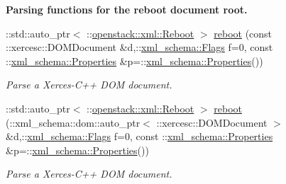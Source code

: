 \begin{Indent}{\bf Parsing functions for the reboot document root.}
\begin{DoxyCompactItemize}
::std::auto\_\-ptr$<$ ::\hyperlink{classopenstack_1_1xml_1_1Reboot}{openstack::xml::Reboot} $>$ \hyperlink{namespaceopenstack_1_1xml_aa69ffb451a12c935feedf4be392e5734}{reboot} (const ::xercesc::DOMDocument \&d,::\hyperlink{namespacexml__schema_affb4c227cbd9aa7453dd1dc5a1401943}{xml\_\-schema::Flags} f=0, const ::\hyperlink{namespacexml__schema_ad27ce19a7ee1d3b1064092648898f64c}{xml\_\-schema::Properties} \&p=::\hyperlink{namespacexml__schema_ad27ce19a7ee1d3b1064092648898f64c}{xml\_\-schema::Properties}())
\begin{DoxyCompactList}\small\item\em Parse a Xerces-\/C++ DOM document. \item\end{DoxyCompactList}\item 
::std::auto\_\-ptr$<$ ::\hyperlink{classopenstack_1_1xml_1_1Reboot}{openstack::xml::Reboot} $>$ \hyperlink{namespaceopenstack_1_1xml_a292311799f1e8d52f78c99988fb621f7}{reboot} (::xml\_\-schema::dom::auto\_\-ptr$<$ ::xercesc::DOMDocument $>$ \&d,::\hyperlink{namespacexml__schema_affb4c227cbd9aa7453dd1dc5a1401943}{xml\_\-schema::Flags} f=0, const ::\hyperlink{namespacexml__schema_ad27ce19a7ee1d3b1064092648898f64c}{xml\_\-schema::Properties} \&p=::\hyperlink{namespacexml__schema_ad27ce19a7ee1d3b1064092648898f64c}{xml\_\-schema::Properties}())
\begin{DoxyCompactList}\small\item\em Parse a Xerces-\/C++ DOM document. \item\end{DoxyCompactList}\end{DoxyCompactItemize}
\end{Indent}

